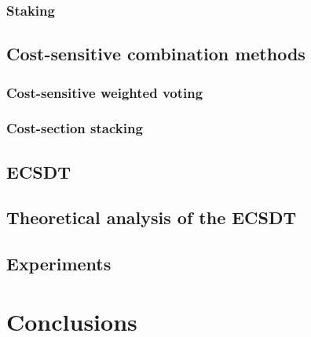 \documentclass[twoside,openright,titlepage,numbers=noenddot,headinclude,%
               footinclude=true,cleardoublepage=empty,abstractoff,BCOR=5mm,%
               paper=a4,fontsize=11pt,ngerman,american,doublespace]{scrreprt}
\numberwithin{theorem}{chapter}
\numberwithin{definition}{chapter}
\numberwithin{algorithm}{chapter}
\numberwithin{figure}{chapter}
\numberwithin{table}{chapter}
\numberwithin{equation}{chapter}
\begin{document}
				\subsection{Staking}
		\section{Cost-sensitive combination methods}
			\subsection{Cost-sensitive weighted voting}
			\subsection{Cost-section stacking}
		\section{ECSDT}
		\section{Theoretical analysis of the ECSDT}
		\section{Experiments}
			
% 
% 
% 
 
\cleardoublepage
\makeatletter
\def\toclevel@chapter{-1}
\makeatother
\chapter{Conclusions}
\end{document}
